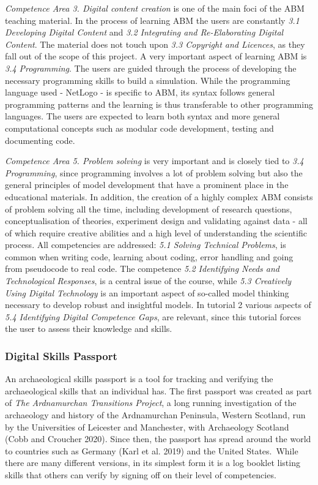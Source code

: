 \documentclass[
]{article}
\begin{document}
\emph{Competence Area 3. Digital content creation} is one of the main foci of the ABM teaching material. In the process of learning ABM the users are constantly \emph{3.1 Developing Digital Content} and \emph{3.2 Integrating and Re-Elaborating Digital Content}. The material does not touch upon \emph{3.3 Copyright and Licences}, as they fall out of the scope of this project. A very important aspect of learning ABM is \emph{3.4 Programming}. The users are guided through the process of developing the necessary programming skills to build a simulation. While the programming language used - NetLogo - is specific to ABM, its syntax follows general programming patterns and the learning is thus transferable to other programming languages. The users are expected to learn both syntax and more general computational concepts such as modular code development, testing and documenting code.

\emph{Competence Area 5. Problem solving} is very important and is closely tied to \emph{3.4 Programming}, since programming involves a lot of problem solving but also the general principles of model development that have a prominent place in the educational materials. In addition, the creation of a highly complex ABM consists of problem solving all the time, including development of research questions, conceptualisation of theories, experiment design and validating against data - all of which require creative abilities and a high level of understanding the scientific process. All competencies are addressed: \emph{5.1 Solving Technical Problems}, is common when writing code, learning about coding, error handling and going from pseudocode to real code. The competence \emph{5.2 Identifying Needs and Technological Responses}, is a central issue of the course, while \emph{5.3 Creatively Using Digital Technology} is an important aspect of so-called model thinking necessary to develop robust and insightful models. In tutorial 2 various aspects of \emph{5.4 Identifying Digital Competence Gaps}, are relevant, since this tutorial forces the user to assess their knowledge and skills.

\hypertarget{digital-skills-passport}{%
\subsubsection{Digital Skills Passport}\label{digital-skills-passport}}

An archaeological skills passport is a tool for tracking and verifying the archaeological skills that an individual has. The first passport was created as part of \emph{The Ardnamurchan Transitions Project}, a long running investigation of the archaeology and history of the Ardnamurchan Peninsula, Western Scotland, run by the Universities of Leicester and Manchester, with Archaeology Scotland (Cobb and Croucher 2020). Since then, the passport has spread around the world to countries such as Germany (Karl et al. 2019) and the United States.~While there are many different versions, in its simplest form it is a log booklet listing skills that others can verify by signing off on their level of competencies.~
\end{document}
